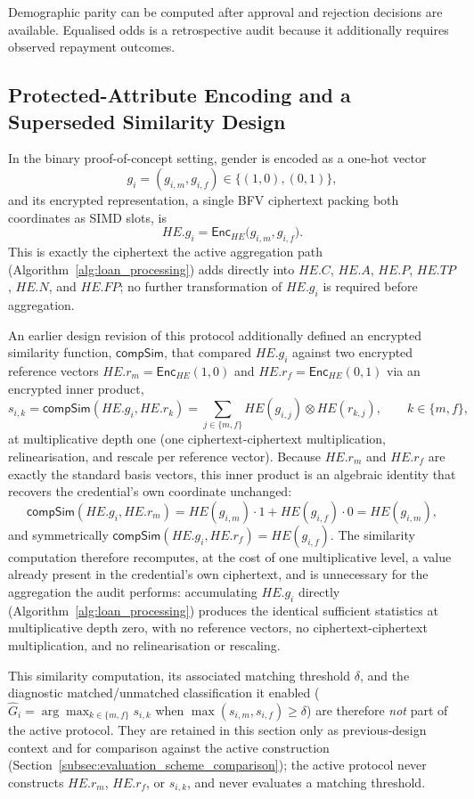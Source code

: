 \documentclass[a4paper,fleqn]{cas-dc}
\begin{document}
Demographic parity can be computed after approval and rejection decisions are
available. Equalised odds is a retrospective audit because it additionally
requires observed repayment outcomes.




\subsection{Protected-Attribute Encoding and a Superseded Similarity Design} \label{subsec:compsim}

In the binary proof-of-concept setting, gender is encoded as a one-hot vector \[ g_i=(g_{i,m},g_{i,f})\in\{(1,0),(0,1)\}, \] and its encrypted representation, a single BFV ciphertext packing both coordinates as SIMD slots, is \[ HE.g_i= \mathsf{Enc}_{HE}\bigl(g_{i,m},g_{i,f}\bigr). \] This is exactly the ciphertext the active aggregation path (Algorithm~\ref{alg:loan_processing}) adds directly into $HE.C$, $HE.A$, $HE.P$, $HE.TP$, $HE.N$, and $HE.FP$; no further transformation of $HE.g_i$ is required before aggregation.

An earlier design revision of this protocol additionally defined an encrypted similarity function, $\textsf{compSim}$, that compared $HE.g_i$ against two encrypted reference vectors $HE.r_m=\mathsf{Enc}_{HE}(1,0)$ and $HE.r_f=\mathsf{Enc}_{HE}(0,1)$ via an encrypted inner product, \[ s_{i,k} = \textsf{compSim}(HE.g_i,HE.r_k) = \sum_{j\in\{m,f\}} HE(g_{i,j})\otimes HE(r_{k,j}), \qquad k\in\{m,f\}, \] at multiplicative depth one (one ciphertext-ciphertext multiplication, relinearisation, and rescale per reference vector). Because $HE.r_m$ and $HE.r_f$ are exactly the standard basis vectors, this inner product is an algebraic identity that recovers the credential's own coordinate unchanged: \[ \textsf{compSim}(HE.g_i,HE.r_m) = HE(g_{i,m})\cdot 1 + HE(g_{i,f})\cdot 0 = HE(g_{i,m}), \] and symmetrically $\textsf{compSim}(HE.g_i,HE.r_f)=HE(g_{i,f})$. The similarity computation therefore recomputes, at the cost of one multiplicative level, a value already present in the credential's own ciphertext, and is unnecessary for the aggregation the audit performs: accumulating $HE.g_i$ directly (Algorithm~\ref{alg:loan_processing}) produces the identical sufficient statistics at multiplicative depth zero, with no reference vectors, no ciphertext-ciphertext multiplication, and no relinearisation or rescaling.

This similarity computation, its associated matching threshold $\delta$, and the diagnostic matched/unmatched classification it enabled ($\widehat{G}_i = \arg\max_{k\in\{m,f\}}s_{i,k}$ when $\max(s_{i,m},s_{i,f})\geq\delta$) are therefore \emph{not} part of the active protocol. They are retained in this section only as previous-design context and for comparison against the active construction (Section~\ref{subsec:evaluation_scheme_comparison}); the active protocol never constructs $HE.r_m$, $HE.r_f$, or $s_{i,k}$, and never evaluates a matching threshold.
\end{document}
